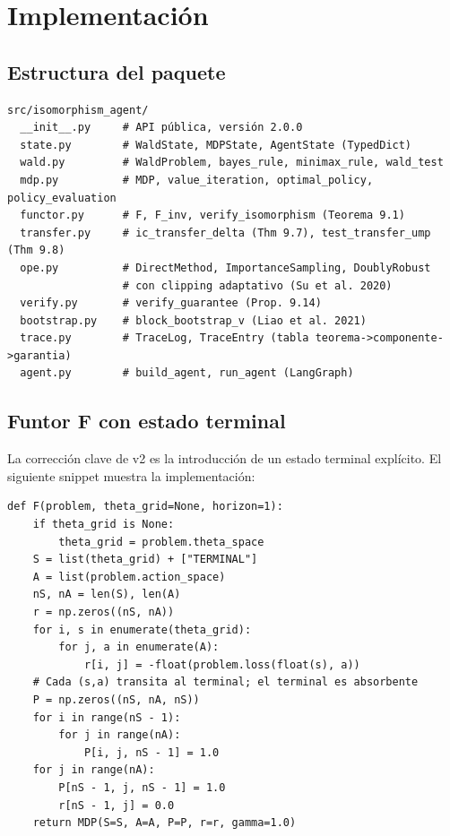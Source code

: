 \documentclass[11pt,a4paper]{article}
\theoremstyle{mitheorem}
\theoremstyle{mitdef}
\begin{document}
\section{Implementación}
\label{sec:impl}

\subsection{Estructura del paquete}

\begin{lstlisting}[caption={Estructura del paquete \texttt{isomorphism\_agent}.}]
src/isomorphism_agent/
  __init__.py     # API pública, versión 2.0.0
  state.py        # WaldState, MDPState, AgentState (TypedDict)
  wald.py         # WaldProblem, bayes_rule, minimax_rule, wald_test
  mdp.py          # MDP, value_iteration, optimal_policy, policy_evaluation
  functor.py      # F, F_inv, verify_isomorphism (Teorema 9.1)
  transfer.py     # ic_transfer_delta (Thm 9.7), test_transfer_ump (Thm 9.8)
  ope.py          # DirectMethod, ImportanceSampling, DoublyRobust
                  # con clipping adaptativo (Su et al. 2020)
  verify.py       # verify_guarantee (Prop. 9.14)
  bootstrap.py    # block_bootstrap_v (Liao et al. 2021)
  trace.py        # TraceLog, TraceEntry (tabla teorema->componente->garantia)
  agent.py        # build_agent, run_agent (LangGraph)
\end{lstlisting}

\subsection{Funtor F con estado terminal}

La corrección clave de v2 es la introducción de un estado terminal
explícito. El siguiente snippet muestra la implementación:

\begin{lstlisting}[caption={Funtor $F$ con estado terminal (corrige bug de v1).}]
def F(problem, theta_grid=None, horizon=1):
    if theta_grid is None:
        theta_grid = problem.theta_space
    S = list(theta_grid) + ["TERMINAL"]
    A = list(problem.action_space)
    nS, nA = len(S), len(A)
    r = np.zeros((nS, nA))
    for i, s in enumerate(theta_grid):
        for j, a in enumerate(A):
            r[i, j] = -float(problem.loss(float(s), a))
    # Cada (s,a) transita al terminal; el terminal es absorbente
    P = np.zeros((nS, nA, nS))
    for i in range(nS - 1):
        for j in range(nA):
            P[i, j, nS - 1] = 1.0
    for j in range(nA):
        P[nS - 1, j, nS - 1] = 1.0
        r[nS - 1, j] = 0.0
    return MDP(S=S, A=A, P=P, r=r, gamma=1.0)
\end{lstlisting}
\end{document}
